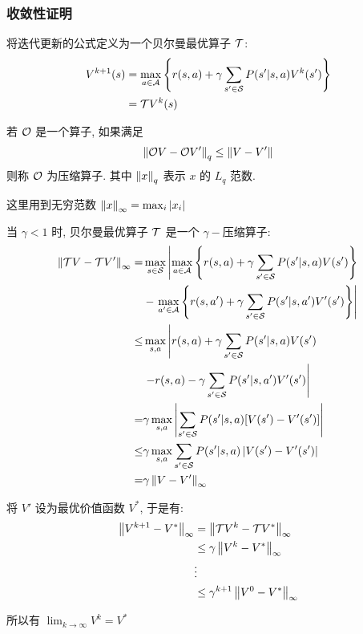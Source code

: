 \subsubsection{收敛性证明}
将迭代更新的公式定义为一个贝尔曼最优算子 $\mathcal{T}$:
\begin{align*}
    V^{k+1}(s)&=\max_{a\in\mathcal{A}}\left\{ r(s,a) + \gamma \sum_{s'\in\mathcal{S}} P(s'|s,a) V^k(s') \right\}\\
    &=\mathcal{T} V^k(s)
\end{align*}

\begin{definition}[压缩算子]
    若 $\mathcal{O}$ 是一个算子, 如果满足 
    \begin{align*}
        \left\lVert\mathcal{O} V-\mathcal{O} V'\right\rVert_q\le \left\lVert V-V'\right\rVert
    \end{align*}
    则称 $\mathcal{O}$ 为压缩算子. 其中 $\left\lVert x\right\rVert_q$ 表示 $x$ 的 $L_q$ 范数.
\end{definition}
这里用到无穷范数 $\left\lVert x\right\rVert_\infty = \max_i |x_i|$

当 $\gamma <1 $ 时, 贝尔曼最优算子 $\mathcal{T}$ 是一个 $\gamma-$压缩算子:
\begin{align*}
    \left\lVert\mathcal{T} V-\mathcal{T} V'\right\rVert_\infty =& \max_{s\in \mathcal{S}} \left| \max_{a\in\mathcal{A}} \left\{ r(s,a) + \gamma \sum_{s'\in\mathcal{S}} P(s'|s,a) V(s') \right\} \right. \\
    & -  \left. \max_{a'\in\mathcal{A}} \left\{ r(s,a') + \gamma \sum_{s'\in\mathcal{S}} P(s'|s,a') V'(s') \right\} \right| \\
    \le & \max_{s,a}\left| r(s, a) + \gamma \sum_{s'\in\mathcal{S}} P(s'|s,a) V(s') \right.\\
    &\left. - r(s,a) - \gamma \sum_{s'\in\mathcal{S}} P(s'|s,a') V'(s') \right|\\
    =& \gamma \max_{s,a}\left|  \sum_{s'\in\mathcal{S}} P(s'|s,a)[V(s')- V'(s')] \right| \\
    \le & \gamma \max_{s,a} \sum_{s'\in\mathcal{S}} P(s'|s,a)\left| V(s')- V'(s') \right| \\
    =& \gamma \left\lVert V - V'\right\rVert_\infty
\end{align*}

将 $V'$ 设为最优价值函数 $V^*$, 于是有:
\begin{align*}
    \left\lVert V^{k+1}-V^*\right\rVert_\infty&=\left\lVert\mathcal{T} V^k - \mathcal{T} V^*\right\rVert_\infty \\
    &\le \gamma \left\lVert V^k - V^*\right\rVert_\infty \\
    &\vdots \\
    &\le \gamma^{k+1}\left\lVert V^0 - V^*\right\rVert_\infty
\end{align*}

所以有 $\lim_{k\to\infty} V^k = V^*$

